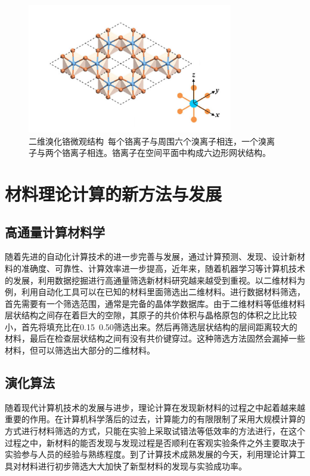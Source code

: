 \begin{figure}[h]
    \centering
\includegraphics[width=0.8\textwidth]{./pic/010-2.png}
\caption{二维溴化铬微观结构\ 每个铬离子与周围六个溴离子相连，一个溴离子与两个铬离子相连。铬离子在空间平面中构成六边形网状结构。}

\label{dog010-2}
\end{figure}

\section{材料理论计算的新方法与发展}

\subsection{高通量计算材料学}

随着先进的自动化计算技术的进一步完善与发展，通过计算预测、发现、设计新材料的准确度、可靠性、计算效率进一步提高，近年来，随着机器学习等计算机技术的发展，利用数据挖掘进行高通量筛选新材料研究越来越受到重视。以二维材料为例，利用自动化工具可以在已知的材料里面筛选出二维材料。进行数据材料筛选，首先需要有一个筛选范围，通常是完备的晶体学数据库。由于二维材料等低维材料层状结构之间存在着巨大的空隙，其原子的共价体积与晶格原包的体积之比比较小，首先将填充比在0.15~0.50筛选出来。然后再筛选层状结构的层间距离较大的材料，最后在检查层状结构之间有没有共价键穿过。这种筛选方法固然会漏掉一些材料，但可以筛选出大部分的二维材料。

\subsection{演化算法}

随着现代计算机技术的发展与进步，理论计算在发现新材料的过程之中起着越来越重要的作用。在计算机科学落后的过去，计算能力的有限限制了采用大规模计算的方式进行材料筛选的方式，只能在实验上采取试错法等低效率的方法进行，在这个过程之中，新材料的能否发现与发现过程是否顺利在客观实验条件之外主要取决于实验参与人员的经验与熟练程度。到了计算技术成熟发展的今天，利用理论计算工具对材料进行初步筛选大大加快了新型材料的发现与实验成功率。

